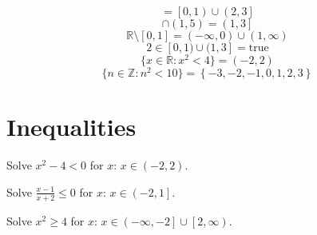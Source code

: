 \documentclass[11pt,a4paper]{article}
\theoremstyle{plain}
\theoremstyle{definition}
\theoremstyle{remark}
\begin{document}
\begin{equation*}
  [0, 1) \cup (2, 3] = \left[0, 1\right) \cup \left(2, 3\right]
\end{equation*}
\begin{equation*}
  [0, 3] \cap (1, 5) = \left(1, 3\right]
\end{equation*}
\begin{equation*}
  \mathbb{R} \setminus [0, 1] = \left(-\infty, 0\right) \cup \left(1, \infty\right)
\end{equation*}
\begin{equation*}
  2 \in [0, 1) \cup (1, 3] = \text{true}
\end{equation*}
\begin{equation*}
  \{x \in \mathbb{R} : x^2 < 4\} = \left(-2, 2\right)
\end{equation*}
\begin{equation*}
  \{n \in \mathbb{Z} : n^2 < 10\} = \left\{-3, -2, -1, 0, 1, 2, 3\right\}
\end{equation*}
\section*{Inequalities}

Solve $x^2 - 4 < 0$ for $x$: $x \in \left(-2, 2\right)$.

Solve $\frac{x - 1}{x + 2} \le 0$ for $x$: $x \in \left(-2, 1\right]$.

Solve $x^2 \ge 4$ for $x$: $x \in \left(-\infty, -2\right] \cup \left[2, \infty\right)$.
\end{document}
